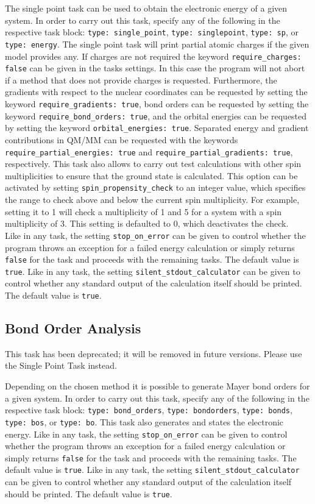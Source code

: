 \documentclass[]{tufte-book}
\begin{document}
The single point task can be used to obtain the electronic energy of a given system. In order to carry out this task,
specify any of the following in the respective task block: \texttt{type: single\_point}, \texttt{type: singlepoint},
\texttt{type: sp}, or \texttt{type: energy}. The single point task will print partial atomic charges if the given
model provides any. If charges are not required the keyword \texttt{require\_charges: false} can be given in the tasks
settings. In this case the program will not abort if a method that does not provide charges is requested.
Furthermore, the gradients with respect to the nuclear coordinates can be requested by setting the keyword \texttt{require\_gradients: true}, bond orders can be requested by setting the keyword \texttt{require\_bond\_orders: true}, and the orbital energies can be requested by setting the keyword \texttt{orbital\_energies: true}.
Separated energy and gradient contributions in QM/MM can be requested with the keywords \texttt{require\_partial\_energies: true} and \texttt{require\_partial\_gradients: true}, respectively.
This task also allows to carry out test calculations with other spin multiplicities to ensure that the ground state is calculated.
This option can be activated by setting \texttt{spin\_propensity\_check} to an integer value, which specifies the range to check above and below the current spin multiplicity.
For example, setting it to 1 will check a multiplicity of 1 and 5 for a system with a spin multiplicity of 3.
This setting is defaulted to 0, which deactivates the check.\\
Like in any task, the setting \texttt{stop\_on\_error} can be given to control whether the program throws an exception for a failed energy calculation or simply returns \texttt{false} for the task and proceeds with the remaining tasks. The default value is \texttt{true}.
Like in any task, the setting \texttt{silent\_stdout\_calculator} can be given to control whether any standard output of the calculation itself should be printed. The default value is \texttt{true}.

\subsection{Bond Order Analysis}

This task has been deprecated; it will be removed in future versions. Please use the Single Point Task instead.

Depending on the chosen method it is possible to generate Mayer bond orders for a given system. In order to carry out this task,
specify any of the following in the respective task block: \texttt{type: bond\_orders}, \texttt{type: bondorders},
\texttt{type: bonds}, \texttt{type: bos}, or \texttt{type: bo}.
This task also generates and states the electronic energy.
Like in any task, the setting \texttt{stop\_on\_error} can be given to control whether the program throws an exception for a failed energy calculation or simply returns \texttt{false} for the task and proceeds with the remaining tasks. The default value is \texttt{true}.
Like in any task, the setting \texttt{silent\_stdout\_calculator} can be given to control whether any standard output of the calculation itself should be printed. The default value is \texttt{true}.
\end{document}
